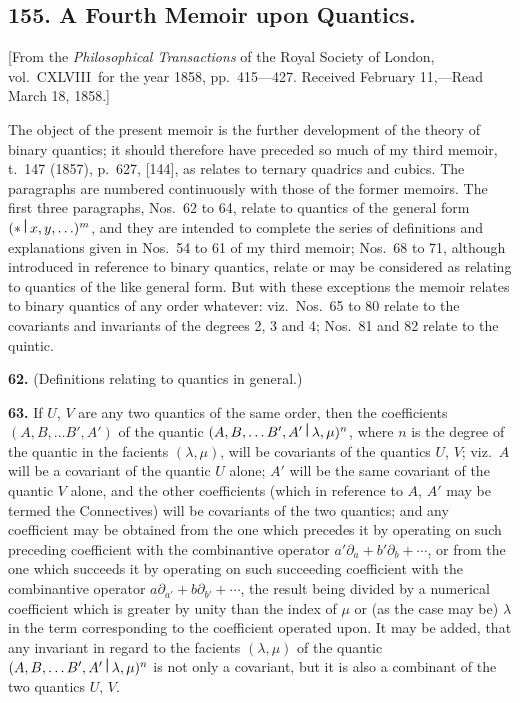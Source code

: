 \documentclass[11pt,a4paper]{book}
\begin{document}
\begin{center}
\newpage

\section*{155. A Fourth Memoir upon Quantics.}

[From the \textit{Philosophical Transactions} of the Royal Society of London, vol.~CXLVIII\ for the year 1858, pp.~415---427.
Received February 11,---Read March 18, 1858.]

\bigskip

The object of the present memoir is the further development of the theory of binary quantics; it should therefore have preceded so much of my third memoir, t.~147 (1857), p.~627, [144], as relates to ternary quadrics and cubics. The paragraphs are numbered continuously with those of the former memoirs. The first three paragraphs, Nos.~62 to 64, relate to quantics of the general form $(*\,\raisebox{0.5ex}{\textbf{\textbar}}\,x,y,\ldots)^m$, and they are intended to complete the series of definitions and explanations given in Nos.~54 to 61 of my third memoir; Nos.~68 to 71, although introduced in reference to binary quantics, relate or may be considered as relating to quantics of the like general form. But with these exceptions the memoir relates to binary quantics of any order whatever: viz.\ Nos.~65 to 80 relate to the covariants and invariants of the degrees 2, 3 and 4; Nos.~81 and 82 relate to the quintic.

\medskip
\noindent\textbf{62.} (Definitions relating to quantics in general.)

\medskip
\noindent\textbf{63.} If $U$, $V$ are any two quantics of the same order, then the coefficients $(A,B,\ldots B',A')$ of the quantic $(A,B,\ldots B',A'\,\raisebox{0.5ex}{\textbf{\textbar}}\,\lambda,\mu)^n$, where $n$ is the degree of the quantic in the facients $(\lambda,\mu)$, will be covariants of the quantics $U$, $V$; viz.\ $A$ will be a covariant of the quantic $U$ alone; $A'$ will be the same covariant of the quantic $V$ alone, and the other coefficients (which in reference to $A$, $A'$ may be termed the Connectives) will be covariants of the two quantics; and any coefficient may be obtained from the one which precedes it by operating on such preceding coefficient with the combinantive operator $a'\partial_a + b'\partial_b + \cdots$, or from the one which succeeds it by operating on such succeeding coefficient with the combinantive operator $a\partial_{a'} + b\partial_{b'} + \cdots$, the result being divided by a numerical coefficient which is greater by unity than the index of $\mu$ or (as the case may be) $\lambda$ in the term corresponding to the coefficient operated upon. It may be added, that any invariant in regard to the facients $(\lambda,\mu)$ of the quantic $(A,B,\ldots B',A'\,\raisebox{0.5ex}{\textbf{\textbar}}\,\lambda,\mu)^n$ is not only a covariant, but it is also a combinant of the two quantics $U$, $V$.


\end{center}
\end{document}
